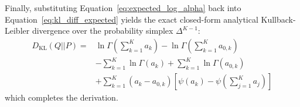 \documentclass{article}
\theoremstyle{plain}
\theoremstyle{definition}
\theoremstyle{remark}
\begin{document}
Finally, substituting Equation~\eqref{eq:expected_log_alpha} back into Equation~\eqref{eq:kl_diff_expected} yields the exact closed-form analytical Kullback-Leibler divergence over the probability simplex $\Delta^{K-1}$:
\begin{align}
  D_{\text{KL}}(Q || P) = & \ln \Gamma\left( \sum_{k=1}^K a_k \right) - \ln \Gamma\left( \sum_{k=1}^K a_{0, k} \right) \nonumber \\
  & - \sum_{k=1}^K \ln \Gamma(a_k) + \sum_{k=1}^K \ln \Gamma(a_{0, k}) \nonumber \\
  & + \sum_{k=1}^K (a_k - a_{0, k})\left[ \psi(a_k) - \psi\left( \sum_{j=1}^K a_j \right) \right]
\end{align}
which completes the derivation.
\end{document}
